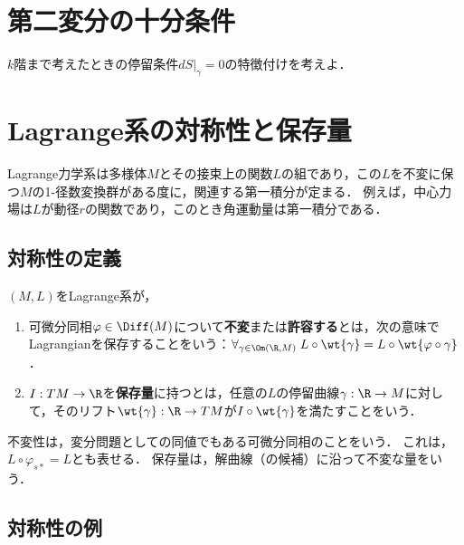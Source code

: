 \documentclass[uplatex,dvipdfmx]{jsreport}
\begin{document}
\section{第二変分の十分条件}

\begin{problem}
    $k$階まで考えたときの停留条件$dS|_{\gamma}=0$の特徴付けを考えよ．
\end{problem}

\section{Lagrange系の対称性と保存量}

\begin{tcolorbox}[colframe=ForestGreen, colback=ForestGreen!10!white,breakable,colbacktitle=ForestGreen!40!white,coltitle=black,fonttitle=\bfseries\sffamily,
title=]
    Lagrange力学系は多様体$M$とその接束上の関数$L$の組であり，この$L$を不変に保つ$M$の1-径数変換群がある度に，関連する第一積分が定まる．
    例えば，中心力場は$L$が動径$r$の関数であり，このとき角運動量は第一積分である．
\end{tcolorbox}

\subsection{対称性の定義}

\begin{definition}
    $(M,L)$をLagrange系が，
    \begin{enumerate}
        \item 可微分同相$\varphi\in\Diff(M)$について\textbf{不変}または\textbf{許容する}とは，次の意味でLagrangianを保存することをいう：$\forall_{\gamma\in\Om(\R,M)}\;L\circ\wt{\gamma}=L\circ\wt{\varphi\circ\gamma}$．
        \item $I:TM\to\R$を\textbf{保存量}に持つとは，任意の$L$の停留曲線$\gamma:\R\to M$に対して，そのリフト$\wt{\gamma}:\R\to TM$が$I\circ\wt{\gamma}$を満たすことをいう．
    \end{enumerate}
\end{definition}
\begin{remarks}
    不変性は，変分問題としての同値でもある可微分同相のことをいう．
    これは，$L\circ\varphi_{s*}=L$とも表せる．
    保存量は，解曲線（の候補）に沿って不変な量をいう．
\end{remarks}

\subsection{対称性の例}
\end{document}
